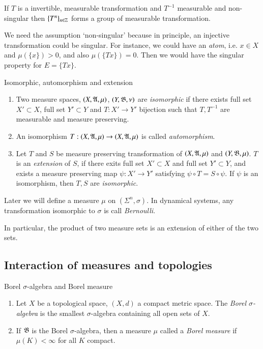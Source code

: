 \documentclass[12pt,a4paper]{article}
\begin{document}
 
 	\begin{lemma}{}{}
 		If $T$ is a invertible, measurable transformation and $T^{-1}$ measurable and non-singular then $\{T^n\}_{n\in \mathbb{Z}}$ forms a group of measurable transformation.
	\end{lemma}
	We need the assumption `non-singular' because in principle, an injective transformation could be singular. For instance, we could have an \emph{atom}, i.e. $x\in X$ and $\mu(\{x\})>0$, and also $\mu(\{Tx\})=0$. Then we would have the singular property for $E=\{Tx\}$.
	\begin{definition}{Isomorphic, automorphism and extension}{}
		\begin{enumerate}
			\item Two measure spaces, $(X,\mathfrak{A},\mu)$, $(Y,\mathfrak{B},\nu)$ are \emph{isomorphic} if there exists full set $X'\subset X$, full set $Y'\subset Y$ and $T:X'\rightarrow Y'$ bijection such that $T, T^{-1}$ are measurable and measure preserving.
			\item An isomorphism $T:(X,\mathfrak{A},\mu)\rightarrow (X,\mathfrak{A},\mu)$ is called \emph{automorphism}.
			\item Let $T$ and $S$ be measure preserving transformation of $(X,\mathfrak{A},\mu)$ and $(Y,\mathfrak{B},\mu)$. $T$ is an \emph{extension} of $S$, if there exits full set $X'\subset X$ and full set $Y'\subset Y$, and exists a measure preserving map $\psi: X'\rightarrow Y'$ satisfying $\psi \circ T = S\circ \psi$. If $\psi$ is an isomorphism, then $T,S$ are \emph{isomorphic}.
		\end{enumerate}
	\end{definition}
	Later we will define a measure $\mu$ on $(\Sigma^n, \sigma).$ In dynamical systems, any transformation isomorphic to $\sigma$ is call \emph{Bernoulli}.
	
	In particular, the product of two measure sets is an extension of either of the two sets.
	
	\subsection{Interaction of measures and topologies}
	\begin{definition}{Borel $\sigma$-algebra and Borel measure}{}
		\begin{enumerate}
			\item Let $X$ be a topological space, $(X,d)$ a compact metric space. The \emph{Borel $\sigma$-algebra} is the smallest $\sigma$-algebra containing all open sets of $X$. 
			\item If $\mathfrak{B}$ is the Borel $\sigma$-algebra, then a measure $\mu$ called a \emph{Borel measure} if $\mu(K)<\infty$ for all $K$ compact.
		\end{enumerate}
	\end{definition}
\end{document}
